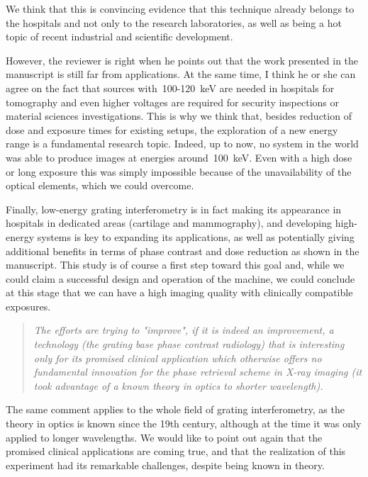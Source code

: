 \documentclass[a4paper,english]{scrartcl}
\newenvironment{reviewerquote}{\begin{quote}\itshape}{\end{quote}}
\begin{document}
We think that this is convincing evidence that this technique already belongs to the
hospitals and not only to the research laboratories, as well as being a hot
topic of recent industrial and scientific development.

However, the reviewer is right when he points out that the work presented in
the manuscript is still far from applications. At the same time, I think he
or she can agree on the fact that sources with~\num{100}-\SI{120}{\kilo\eV} are needed in
hospitals for tomography and even higher voltages are required for security
inspections or material sciences investigations.
This is why we think that, besides reduction of dose and exposure times for
existing setups, the exploration of a new energy range is a fundamental
research topic. Indeed, up to now, no system in the world was able to
produce images at energies around~\SI{100}{\kilo\eV}. Even with a high
dose or long exposure
this was simply impossible because of the unavailability of the optical
elements, which we could overcome.

Finally, low-energy grating interferometry is in fact making its appearance
in hospitals in dedicated areas (cartilage and mammography), and developing
high-energy systems is key to expanding its applications, as well as
potentially giving
additional benefits in terms of phase contrast and dose reduction as shown
in the manuscript.
This study is of course a first step toward this goal and,
while we could claim a successful design and operation of the machine, we
could conclude at this stage that we can have a high imaging quality with
clinically compatible exposures.

\begin{reviewerquote}
     The efforts are trying to "improve", if it is indeed an improvement, a
     technology (the grating base phase contrast radiology) that is
     interesting only for its promised clinical application which otherwise
     offers no fundamental innovation for the phase retrieval scheme in
     X-ray imaging (it took advantage of a known theory in optics to shorter
     wavelength).
\end{reviewerquote}
The same comment applies to the whole field of grating interferometry, as the
theory in optics is known since the 19th century, although at the time it
was only applied to longer wavelengths. We would like to point out again
that the promised clinical applications are coming true, and that the
realization of this experiment had its remarkable challenges, despite being
known in theory.
\end{document}
